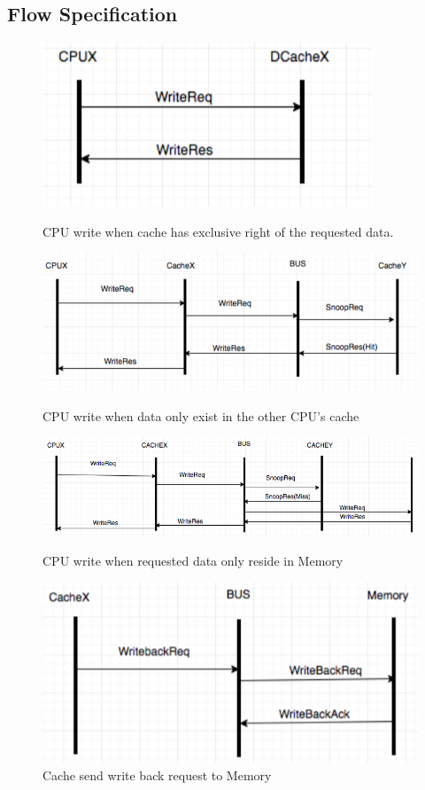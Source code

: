 \documentclass[12pt,frontmatter,copyright,thesis]{usfmanus}
\begin{document}
\begin{appendix}
\section{Flow Specification}
\begin{figure}[h!] 
\centering
 \includegraphics[width=2In]{y1.png}
  \caption{\footnotesize CPU write when cache has exclusive right of the requested data. }
 \label{y1}
 \centering
 \includegraphics[width=3.6In]{y2.png}
 \caption{\footnotesize CPU write when data only exist in the other CPU's cache }
 \label{y2}
 \centering
 \includegraphics[width=5In]{y3.png}
 \caption{\footnotesize CPU write when requested data only reside in Memory }
 \label{y3}
 \centering
 \includegraphics[width=2.8In]{y4.png}
 \caption{\footnotesize Cache send write back request to Memory}
 \label{y4}
\end{figure}


\end{appendix}
\end{document}
